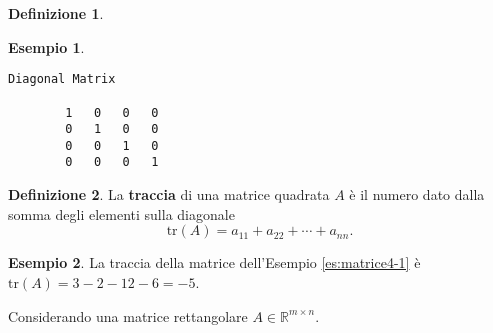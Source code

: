 \documentclass{book}
\theoremstyle{definition}
\newtheorem{defi}{Definizione}[section]
\newtheorem{es}{Esempio}[section]
\theoremstyle{plain}
\begin{document}
\begin{defi}
\begin{itemize}
\begin{es}
\begin{lstlisting}[caption=generare una matrice identità in GNU/Octave]
        Diagonal Matrix

        1   0   0   0
        0   1   0   0
        0   0   1   0
        0   0   0   1
      \end{lstlisting}
    \end{es}
  \end{itemize}
\end{defi}
\begin{defi}
  \label{defi:matrice5}
  La \textbf{traccia} di una matrice quadrata $A$ è il numero dato dalla
  somma degli elementi sulla diagonale
  \begin{equation*}
    \mathrm{tr}(A)=a_{11}+a_{22}+\cdots+a_{nn}.
  \end{equation*}
\end{defi}
\begin{es}
  La traccia della matrice dell'Esempio \ref{es:matrice4-1} è
  $\mathrm{tr}(A)=3-2-12-6=-5$.
\end{es}
Considerando una matrice rettangolare $A\in\mathds{R}^{m\times n}$.
\end{document}
